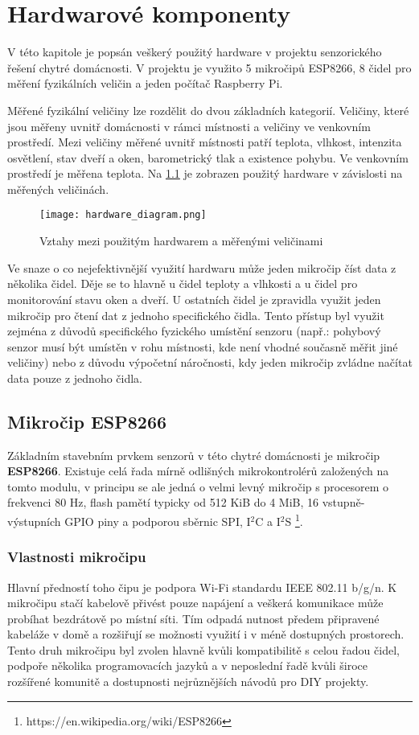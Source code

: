 \chapter{Hardwarové komponenty} \label{chap:hardware}
V této kapitole je popsán veškerý použitý hardware v projektu senzorického řešení chytré domácnosti. V projektu je využito 5 mikročipů ESP8266, 8 čidel pro měření fyzikálních veličin a jeden počítač Raspberry Pi. 

Měřené fyzikální veličiny lze rozdělit do dvou základních kategorií. Veličiny, které jsou měřeny uvnitř domácnosti v rámci místnosti a veličiny ve venkovním prostředí. Mezi veličiny měřené uvnitř místnosti patří teplota, vlhkost, intenzita osvětlení, stav dveří a oken, barometrický tlak a existence pohybu. Ve venkovním prostředí je měřena teplota. Na \cref{fig:hardware_diagram} je zobrazen použitý hardware v závislosti na měřených veličinách. 

\begin{figure}[H]
  \centering
  \texttt{[image: hardware\_diagram.png]}
  \caption{Vztahy mezi použitým hardwarem a měřenými veličinami}
  \label{fig:hardware_diagram}
\end{figure}

Ve snaze o co nejefektivnější využití hardwaru může jeden mikročip číst data z několika čidel. Děje se to hlavně u čidel teploty a vlhkosti a u čidel pro monitorování stavu oken a dveří. U ostatních čidel je zpravidla využit jeden mikročip pro čtení dat z jednoho specifického čidla. Tento přístup byl využit zejména z důvodů specifického fyzického umístění senzoru (např.: pohybový senzor musí být umístěn v rohu místnosti, kde není vhodné současně měřit jiné veličiny) nebo z důvodu výpočetní náročnosti, kdy jeden mikročip zvládne načítat data pouze z jednoho čidla.

\section{Mikročip ESP8266} \label{sec:esp8266}

Základním stavebním prvkem senzorů v této chytré domácnosti je mikročip \textbf{ESP8266}. Existuje celá řada mírně odlišných mikrokontrolérů založených na tomto modulu, v principu se ale jedná o velmi levný mikročip s procesorem o frekvenci 80 Hz, flash pamětí typicky od 512 KiB do 4 MiB, 16 vstupně-výstupních GPIO piny a podporou sběrnic SPI,  I$^2$C a I$^2$S \footnote{https://en.wikipedia.org/wiki/ESP8266}.

\subsection*{Vlastnosti mikročipu}
Hlavní předností toho čipu je podpora Wi-Fi standardu IEEE 802.11 b/g/n. K mikročipu stačí kabelově přivést pouze napájení a veškerá komunikace může probíhat bezdrátově po místní síti. Tím odpadá nutnost předem připravené kabeláže v domě a rozšiřují se možnosti využití i v méně dostupných prostorech. Tento druh mikročipu byl zvolen hlavně kvůli kompatibilitě s celou řadou čidel, podpoře několika programovacích jazyků a v neposlední řadě kvůli široce rozšířené komunitě a dostupnosti nejrůznějších návodů pro DIY projekty.

